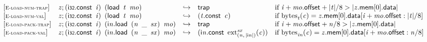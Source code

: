 $$
\begin{array}{@{}l@{}lcl@{}l@{}}
{[\textsc{\scriptsize E{-}load{-}num{-}trap}]} \quad & {\mathit{z}} ; (\mathsf{i{\scriptstyle32}}.\mathsf{const}~\,{\mathit{i}})~\,(\mathsf{load}~\,{\mathit{t}}~\,{\mathit{mo}}) &\hookrightarrow& \mathsf{trap} &\quad
  \mbox{if}~{\mathit{i}} + {\mathit{mo}}.\mathsf{offset} + {|{\mathit{t}}|} / 8 > {|{{\mathit{z}}.\mathsf{mem}}{{}[0]}.\mathsf{data}|} \\
{[\textsc{\scriptsize E{-}load{-}num{-}val}]} \quad & {\mathit{z}} ; (\mathsf{i{\scriptstyle32}}.\mathsf{const}~\,{\mathit{i}})~\,(\mathsf{load}~\,{\mathit{t}}~\,{\mathit{mo}}) &\hookrightarrow& ({\mathit{t}}.\mathsf{const}~\,{\mathit{c}}) &\quad
  \mbox{if}~{{\mathrm{bytes}}}_{{\mathit{t}}}({\mathit{c}}) = {{\mathit{z}}.\mathsf{mem}}{{}[0]}.\mathsf{data}{}[{\mathit{i}} + {\mathit{mo}}.\mathsf{offset} : {|{\mathit{t}}|} / 8] \\
{[\textsc{\scriptsize E{-}load{-}pack{-}trap}]} \quad & {\mathit{z}} ; (\mathsf{i{\scriptstyle32}}.\mathsf{const}~\,{\mathit{i}})~\,({\mathsf{i}}{{\mathit{n}}}.\mathsf{load}~\,({\mathit{n}}~\,\mathsf{\_}~\,{\mathit{sx}})~\,{\mathit{mo}}) &\hookrightarrow& \mathsf{trap} &\quad
  \mbox{if}~{\mathit{i}} + {\mathit{mo}}.\mathsf{offset} + {\mathit{n}} / 8 > {|{{\mathit{z}}.\mathsf{mem}}{{}[0]}.\mathsf{data}|} \\
{[\textsc{\scriptsize E{-}load{-}pack{-}val}]} \quad & {\mathit{z}} ; (\mathsf{i{\scriptstyle32}}.\mathsf{const}~\,{\mathit{i}})~\,({\mathsf{i}}{{\mathit{n}}}.\mathsf{load}~\,({\mathit{n}}~\,\mathsf{\_}~\,{\mathit{sx}})~\,{\mathit{mo}}) &\hookrightarrow& ({\mathsf{i}}{{\mathit{n}}}.\mathsf{const}~\,{{{{\mathrm{ext}}}_{({\mathit{n}},\, {|{\mathsf{i}}{{\mathit{n}}}|})}^{{\mathit{sx}}}}}{({\mathit{c}})}) &\quad
  \mbox{if}~{{\mathrm{bytes}}}_{{{\mathit{i}}}{{\mathit{n}}}}({\mathit{c}}) = {{\mathit{z}}.\mathsf{mem}}{{}[0]}.\mathsf{data}{}[{\mathit{i}} + {\mathit{mo}}.\mathsf{offset} : {\mathit{n}} / 8] \\
\end{array}
$$

\vspace{1ex}

